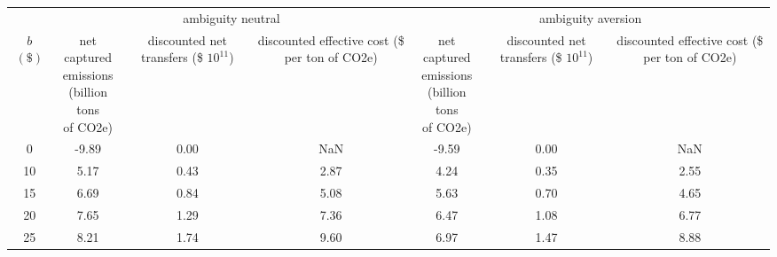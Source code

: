 
\begin{tabular}[t]{ccccccc}
\toprule

& \multicolumn{3}{c}{ambiguity neutral} & \multicolumn{3}{c}{ambiguity aversion} \\
\cmidrule[1pt](r){2-4} \cmidrule[1pt](r){5-7} 
 \makecell[c]{$b$ \\ $(\$)$} & \makecell[c]{net captured \\ emissions \\ (billion tons \\ of CO2e)} & \makecell[c]{discounted \\net transfers \\ \\ (\$ $10^{11}$)} & \makecell[c]{discounted \\ effective cost \\ (\$ per ton \\ of CO2e)} &
\makecell[c]{net captured \\ emissions \\ (billion tons \\ of CO2e)} & \makecell[c]{discounted \\net transfers \\ \\ (\$ $10^{11}$)} & \makecell[c]{discounted \\ effective cost \\ (\$ per ton \\ of CO2e)}\\
\midrule



  0 &    -9.89 &   0.00 &       NaN & -9.59 &   0.00 &       NaN \\
 10  &  5.17&   0.43 &  2.87  &   4.24 &   0.35 &  2.55 \\
15 &  6.69 &   0.84 &  5.08  &   5.63 &   0.70 &  4.65 \\
  20 &   7.65 &   1.29 &  7.36  &   6.47 &   1.08 &  6.77 \\
 25 &  8.21&   1.74 &  9.60 &   6.97 &   1.47 &  8.88 \\

\bottomrule
\end{tabular}
